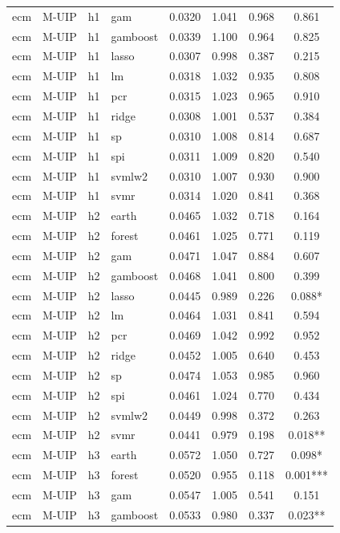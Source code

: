 \begin{ThreePartTable}
\begin{longtable}[t]{llclcccc}
ecm & M-UIP & h1 & gam & 0.0320 & 1.041 & 0.968 & 0.861\\
ecm & M-UIP & h1 & gamboost & 0.0339 & 1.100 & 0.964 & 0.825\\
ecm & M-UIP & h1 & lasso & 0.0307 & 0.998 & 0.387 & 0.215\\
ecm & M-UIP & h1 & lm & 0.0318 & 1.032 & 0.935 & 0.808\\
ecm & M-UIP & h1 & pcr & 0.0315 & 1.023 & 0.965 & 0.910\\
ecm & M-UIP & h1 & ridge & 0.0308 & 1.001 & 0.537 & 0.384\\
ecm & M-UIP & h1 & sp & 0.0310 & 1.008 & 0.814 & 0.687\\
ecm & M-UIP & h1 & spi & 0.0311 & 1.009 & 0.820 & 0.540\\
ecm & M-UIP & h1 & svmlw2 & 0.0310 & 1.007 & 0.930 & 0.900\\
ecm & M-UIP & h1 & svmr & 0.0314 & 1.020 & 0.841 & 0.368\\
\addlinespace
ecm & M-UIP & h2 & earth & 0.0465 & 1.032 & 0.718 & 0.164\\
ecm & M-UIP & h2 & forest & 0.0461 & 1.025 & 0.771 & 0.119\\
ecm & M-UIP & h2 & gam & 0.0471 & 1.047 & 0.884 & 0.607\\
ecm & M-UIP & h2 & gamboost & 0.0468 & 1.041 & 0.800 & 0.399\\
ecm & M-UIP & h2 & lasso & 0.0445 & 0.989 & 0.226 & 0.088*\\
ecm & M-UIP & h2 & lm & 0.0464 & 1.031 & 0.841 & 0.594\\
ecm & M-UIP & h2 & pcr & 0.0469 & 1.042 & 0.992 & 0.952\\
ecm & M-UIP & h2 & ridge & 0.0452 & 1.005 & 0.640 & 0.453\\
ecm & M-UIP & h2 & sp & 0.0474 & 1.053 & 0.985 & 0.960\\
ecm & M-UIP & h2 & spi & 0.0461 & 1.024 & 0.770 & 0.434\\
ecm & M-UIP & h2 & svmlw2 & 0.0449 & 0.998 & 0.372 & 0.263\\
ecm & M-UIP & h2 & svmr & 0.0441 & 0.979 & 0.198 & 0.018**\\
\addlinespace
ecm & M-UIP & h3 & earth & 0.0572 & 1.050 & 0.727 & 0.098*\\
ecm & M-UIP & h3 & forest & 0.0520 & 0.955 & 0.118 & 0.001***\\
ecm & M-UIP & h3 & gam & 0.0547 & 1.005 & 0.541 & 0.151\\
ecm & M-UIP & h3 & gamboost & 0.0533 & 0.980 & 0.337 & 0.023**\\

\end{longtable}
\end{ThreePartTable}
